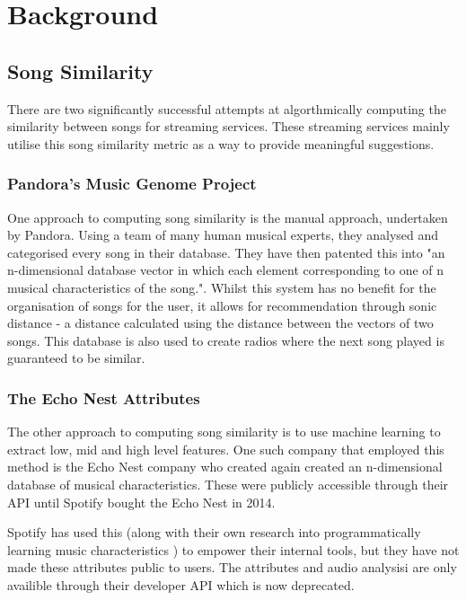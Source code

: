 \chapter{Background}
\section{Song Similarity}
There are two significantly successful attempts at algorthmically computing the similarity between songs for streaming services. These streaming services mainly utilise this song similarity metric as a way to provide meaningful suggestions.

\subsection{Pandora's Music Genome Project}
One approach to computing song similarity is the manual approach, undertaken by Pandora. Using a team of many human musical experts, they analysed and categorised every song in their database. They have then patented this into "an n-dimensional database vector in which each element corresponding to one of n musical characteristics of the song."\cite{pandoraPatent}. Whilst this system has no benefit for the organisation of songs for the user, it allows for recommendation through sonic distance - a distance calculated using the distance between the vectors of two songs. This database is also used to create radios where the next song played is guaranteed to be similar.

\subsection{The Echo Nest Attributes}
The other approach to computing song similarity is to use machine learning to extract low, mid and high level features. One such company that employed this method is the Echo Nest company who created again created an n-dimensional database of musical characteristics. These were publicly accessible through their API until Spotify bought the Echo Nest in 2014.

Spotify has used this (along with their own research into programmatically learning music characteristics \cite{spotify_ismir_21_machine_Learning}) to empower their internal tools\cite{how_spotify_uses_echo_nest}, but they have not made these attributes public to users. The attributes and audio analysisi are only availible through their developer API which is now deprecated.


